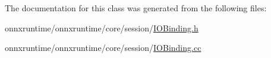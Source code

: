 The documentation for this class was generated from the following files\+:\begin{DoxyCompactItemize}
\item 
onnxruntime/onnxruntime/core/session/\mbox{\hyperlink{IOBinding_8h}{I\+O\+Binding.\+h}}\item 
onnxruntime/onnxruntime/core/session/\mbox{\hyperlink{IOBinding_8cc}{I\+O\+Binding.\+cc}}\end{DoxyCompactItemize}
